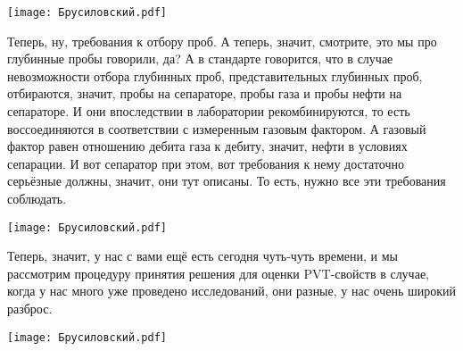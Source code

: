 \documentclass[main.tex]{subfiles}
\begin{document}
\begin{center}
\texttt{[image: Брусиловский.pdf]}
\end{center}

Теперь, ну, требования к отбору проб.
А теперь, значит, смотрите, это мы про глубинные пробы говорили, да?
А в стандарте говорится, что в случае невозможности отбора глубинных проб, представительных глубинных проб, отбираются, значит, пробы на сепараторе, пробы газа и пробы нефти на сепараторе.
И они впоследствии в лаборатории рекомбинируются, то есть воссоединяются в соответствии с измеренным газовым фактором.
А газовый фактор равен отношению дебита газа к дебиту, значит, нефти в условиях сепарации.
И вот сепаратор при этом, вот требования к нему достаточно серьёзные должны, значит, они тут описаны.
То есть, нужно все эти требования соблюдать.

\begin{center}
\texttt{[image: Брусиловский.pdf]}
\end{center}

Теперь, значит, у нас с вами ещё есть сегодня чуть-чуть времени, и мы рассмотрим процедуру принятия решения для оценки PVT-свойств в случае, когда у нас много уже проведено исследований, они разные, у нас очень широкий разброс.

\begin{center}
\texttt{[image: Брусиловский.pdf]}
\end{center}
\end{document}
